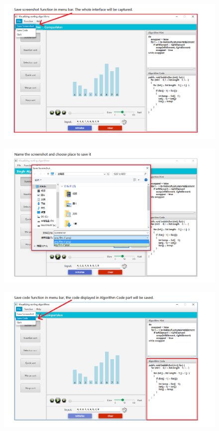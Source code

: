 \documentclass[paper=a4, fontsize=11pt,twoside]{scrartcl}		%
\begin{document}
\begin{figure}[htbp]
\centering
\includegraphics[width=1\textwidth]{user_menu/8.png}
\label{user_menu8}
\end{figure}

\begin{figure}[htbp]
\centering
\includegraphics[width=1\textwidth]{user_menu/9.png}
\label{user_menu9}
\end{figure}

\begin{figure}[htbp]
\centering
\includegraphics[width=1\textwidth]{user_menu/10.png}
\label{user_menu10}
\end{figure}
\end{document}
